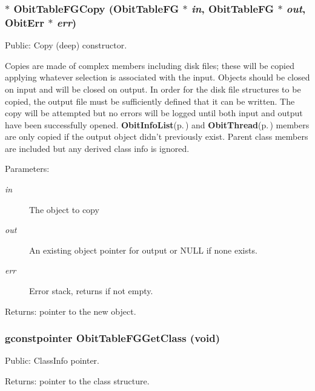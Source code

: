 \subsubsection{$\ast$ Obit\-Table\-FGCopy ({\bf Obit\-Table\-FG} $\ast$ {\em in}, {\bf Obit\-Table\-FG} $\ast$ {\em out}, {\bf Obit\-Err} $\ast$ {\em err})}\label{ObitTableFG_8c_a20}


Public: Copy (deep) constructor. 

Copies are made of complex members including disk files; these will be copied applying whatever selection is associated with the input. Objects should be closed on input and will be closed on output. In order for the disk file structures to be copied, the output file must be sufficiently defined that it can be written. The copy will be attempted but no errors will be logged until both input and output have been successfully opened. {\bf Obit\-Info\-List}{\rm (p.\,\pageref{structObitInfoList})} and {\bf Obit\-Thread}{\rm (p.\,\pageref{structObitThread})} members are only copied if the output object didn't previously exist. Parent class members are included but any derived class info is ignored. \begin{Desc}
\item[Parameters:]
\begin{description}
\item[{\em in}]The object to copy \item[{\em out}]An existing object pointer for output or NULL if none exists. \item[{\em err}]Error stack, returns if not empty. \end{description}
\end{Desc}
\begin{Desc}
\item[Returns:]pointer to the new object. \end{Desc}
\subsubsection{\setlength{\rightskip}{0pt plus 5cm}gconstpointer Obit\-Table\-FGGet\-Class (void)}\label{ObitTableFG_8c_a17}


Public: Class\-Info pointer. 

\begin{Desc}
\item[Returns:]pointer to the class structure. \end{Desc}

